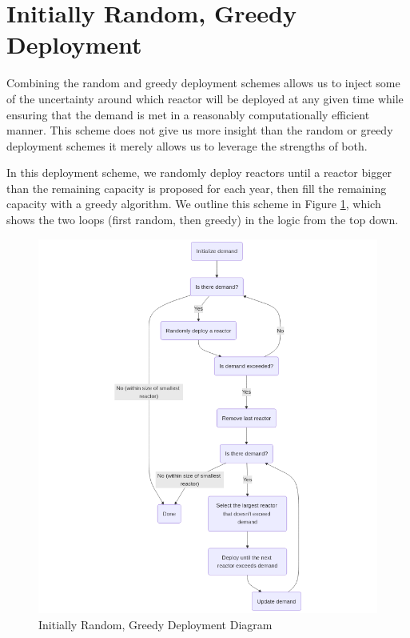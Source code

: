 \section{Initially Random, Greedy Deployment}
\label{sec:initially_random_greedy}

Combining the random and greedy deployment schemes allows us to inject some of
the uncertainty around which reactor will be deployed at any given time while
ensuring that the demand is met in a reasonably computationally efficient
manner. This scheme does not give us more insight than the random or greedy
deployment schemes it merely allows us to leverage the strengths of both.

In this deployment scheme, we randomly deploy reactors until a reactor bigger
than the remaining capacity is proposed for each year, then fill the remaining
capacity with a greedy algorithm. We outline this scheme in Figure
\ref{fig:init_random_greedy_diagram}, which shows the two loops (first random,
then greedy) in the logic from the top down.

\begin{figure}[H]
    \centering
    \includegraphics[scale=0.7]{images/schemes/random_greedy_diagram.png}
    \caption{Initially Random, Greedy Deployment Diagram}
    \label{fig:init_random_greedy_diagram}
\end{figure}

